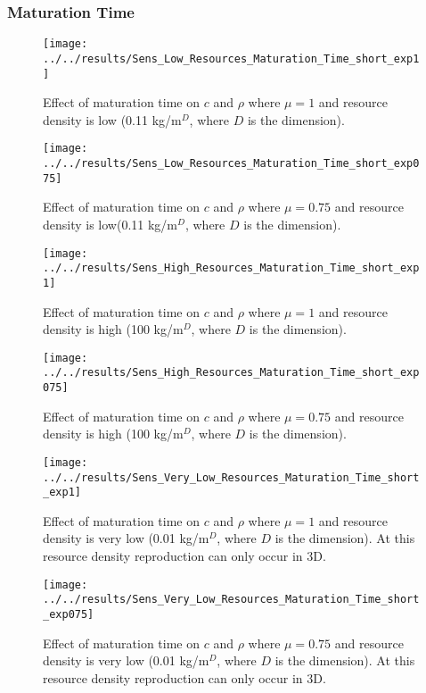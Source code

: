 \subsubsection{Maturation Time}
\begin{figure}[H]
	\centering
	\texttt{[image: ../../results/Sens\_Low\_Resources\_Maturation\_Time\_short\_exp1]}
	\caption{Effect of maturation time on $c$ and $\rho$ where $\mu = 1$ and resource density is low (0.11 kg/m$^D$, where $D$ is the dimension).}
	\label{fig:senslowresourcesmaturationtimeshortexp1}
\end{figure}
\begin{figure}[h]
	\centering
	\texttt{[image: ../../results/Sens\_Low\_Resources\_Maturation\_Time\_short\_exp075]}
	\caption{Effect of maturation time on $c$ and $\rho$ where $\mu = 0.75$ and resource density is low(0.11 kg/m$^D$, where $D$ is the dimension).}
	\label{fig:senslowresourcesmaturationtimeshortexp075}
\end{figure}
\begin{figure}[h]
	\centering
	\texttt{[image: ../../results/Sens\_High\_Resources\_Maturation\_Time\_short\_exp1]}
	\caption{Effect of maturation time on $c$ and $\rho$ where $\mu = 1$ and resource density is high (100 kg/m$^D$, where $D$ is the dimension).}
	\label{fig:senshighresourcesmaturationtimeshortexp1}
\end{figure}
\begin{figure}[h]
	\centering
	\texttt{[image: ../../results/Sens\_High\_Resources\_Maturation\_Time\_short\_exp075]}
	\caption{Effect of maturation time on $c$ and $\rho$ where $\mu = 0.75$ and resource density is high (100 kg/m$^D$, where $D$ is the dimension).}
	\label{fig:sensmaturationtimeshortexp075}
\end{figure}
\begin{figure}[h]
	\centering
	\texttt{[image: ../../results/Sens\_Very\_Low\_Resources\_Maturation\_Time\_short\_exp1]}
	\caption{Effect of maturation time on $c$ and $\rho$ where $\mu = 1$ and resource density is very low (0.01 kg/m$^D$, where $D$ is the dimension).  At this resource density reproduction can only occur in 3D.}
	\label{fig:sensverylowresourcesmaturationtimeshortexp1}
\end{figure}

\begin{figure}[h]
	\centering
	\texttt{[image: ../../results/Sens\_Very\_Low\_Resources\_Maturation\_Time\_short\_exp075]}
	\caption{Effect of maturation time on $c$ and $\rho$ where $\mu = 0.75$ and resource density is very low (0.01 kg/m$^D$, where $D$ is the dimension).  At this resource density reproduction can only occur in 3D.}
	\label{fig:sensverylowresourcesmaturationtimeshortexp075}
\end{figure}




